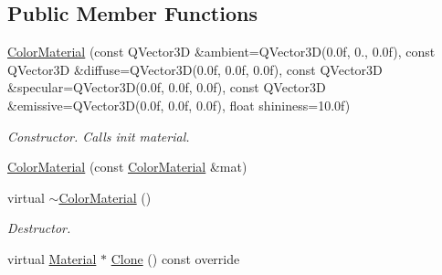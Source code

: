 \subsection*{Public Member Functions}
\begin{DoxyCompactItemize}
\item 
\mbox{\label{class_geometry_engine_1_1_geometry_material_1_1_color_material_af445424ce4cb91403b9623cee72fdf92}} 
\mbox{\hyperlink{class_geometry_engine_1_1_geometry_material_1_1_color_material_af445424ce4cb91403b9623cee72fdf92}{Color\+Material}} (const Q\+Vector3D \&ambient=Q\+Vector3D(0.\+0f, 0., 0.\+0f), const Q\+Vector3\+D \&diffuse=\+Q\+Vector3\+D(0.\+0f, 0.\+0f, 0.\+0f), const Q\+Vector3\+D \&specular=\+Q\+Vector3\+D(0.\+0f, 0.\+0f, 0.\+0f), const Q\+Vector3\+D \&emissive=\+Q\+Vector3\+D(0.\+0f, 0.\+0f, 0.\+0f), float shininess=10.\+0f)
\begin{DoxyCompactList}\small\item\em Constructor. Calls init material. \end{DoxyCompactList}\item 
\mbox{\hyperlink{class_geometry_engine_1_1_geometry_material_1_1_color_material_a42495fe930beb678d0c31a93045572e3}{Color\+Material}} (const \mbox{\hyperlink{class_geometry_engine_1_1_geometry_material_1_1_color_material}{Color\+Material}} \&mat)
\item 
\mbox{\label{class_geometry_engine_1_1_geometry_material_1_1_color_material_a7d7fcbb8896167b79be5e2e1938f963c}} 
virtual \mbox{\hyperlink{class_geometry_engine_1_1_geometry_material_1_1_color_material_a7d7fcbb8896167b79be5e2e1938f963c}{$\sim$\+Color\+Material}} ()
\begin{DoxyCompactList}\small\item\em Destructor. \end{DoxyCompactList}\item 
virtual \mbox{\hyperlink{class_geometry_engine_1_1_geometry_material_1_1_material}{Material}} $\ast$ \mbox{\hyperlink{class_geometry_engine_1_1_geometry_material_1_1_color_material_a29dbf04e76b75fcc86f184d072bba0a5}{Clone}} () const override
\end{DoxyCompactItemize}
